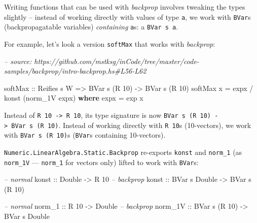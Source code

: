 \documentclass[]{article}
\newenvironment{Shaded}{}{}
\newcommand{\CommentTok}[1]{\textcolor[rgb]{0.38,0.63,0.69}{\textit{#1}}}
\newcommand{\DataTypeTok}[1]{\textcolor[rgb]{0.56,0.13,0.00}{#1}}
\newcommand{\DecValTok}[1]{\textcolor[rgb]{0.25,0.63,0.44}{#1}}
\newcommand{\FunctionTok}[1]{\textcolor[rgb]{0.02,0.16,0.49}{#1}}
\newcommand{\KeywordTok}[1]{\textcolor[rgb]{0.00,0.44,0.13}{\textbf{#1}}}
\newcommand{\NormalTok}[1]{#1}
\newcommand{\OtherTok}[1]{\textcolor[rgb]{0.00,0.44,0.13}{#1}}
\begin{document}
Writing functions that can be used with \emph{backprop} involves tweaking the
types slightly -- instead of working directly with values of type \texttt{a}, we
work with \texttt{BVar}s (backpropagatable variables) \emph{containing}
\texttt{a}s: a \texttt{BVar\ s\ a}.

For example, let's look a version \texttt{softMax} that works with
\emph{backprop}:

\begin{Shaded}
\begin{Highlighting}[]
\CommentTok{-- source: https://github.com/mstksg/inCode/tree/master/code-samples/backprop/intro-backprop.hs#L56-L62}

\NormalTok{softMax}
\OtherTok{    ::} \DataTypeTok{Reifies}\NormalTok{ s }\DataTypeTok{W}
    \OtherTok{=>} \DataTypeTok{BVar}\NormalTok{ s (}\DataTypeTok{R} \DecValTok{10}\NormalTok{)}
    \OtherTok{->} \DataTypeTok{BVar}\NormalTok{ s (}\DataTypeTok{R} \DecValTok{10}\NormalTok{)}
\NormalTok{softMax x }\FunctionTok{=}\NormalTok{ expx }\FunctionTok{/}\NormalTok{ konst (norm_1V expx)}
  \KeywordTok{where}
\NormalTok{    expx }\FunctionTok{=}\NormalTok{ exp x}
\end{Highlighting}
\end{Shaded}

Instead of \texttt{R\ 10\ -\textgreater{}\ R\ 10}, its type signature is now
\texttt{BVar\ s\ (R\ 10)\ -\textgreater{}\ BVar\ s\ (R\ 10)}. Instead of working
directly with \texttt{R\ 10}s (10-vectors), we work with
\texttt{BVar\ s\ (R\ 10)}s (\texttt{BVar}s containing 10-vectors).

\texttt{Numeric.LinearAlgebra.Static.Backprop} re-exports \texttt{konst} and
\texttt{norm\_1} (as \texttt{norm\_1V} --- \texttt{norm\_1} for vectors only)
lifted to work with \texttt{BVar}s:

\begin{Shaded}
\begin{Highlighting}[]
\CommentTok{-- normal}
\OtherTok{konst   ::}        \DataTypeTok{Double} \OtherTok{->}         \DataTypeTok{R} \DecValTok{10}
\CommentTok{-- backprop}
\OtherTok{konst   ::} \DataTypeTok{BVar}\NormalTok{ s }\DataTypeTok{Double} \OtherTok{->} \DataTypeTok{BVar}\NormalTok{ s (}\DataTypeTok{R} \DecValTok{10}\NormalTok{)}

\CommentTok{-- normal}
\OtherTok{norm_1  ::}         \DataTypeTok{R} \DecValTok{10}  \OtherTok{->}        \DataTypeTok{Double}
\CommentTok{-- backprop}
\OtherTok{norm_1V ::} \DataTypeTok{BVar}\NormalTok{ s (}\DataTypeTok{R} \DecValTok{10}\NormalTok{) }\OtherTok{->} \DataTypeTok{BVar}\NormalTok{ s }\DataTypeTok{Double}
\end{Highlighting}
\end{Shaded}
\end{document}
